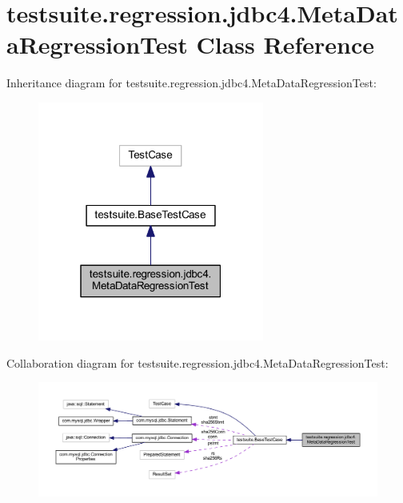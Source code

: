 \hypertarget{classtestsuite_1_1regression_1_1jdbc4_1_1_meta_data_regression_test}{}\section{testsuite.\+regression.\+jdbc4.\+Meta\+Data\+Regression\+Test Class Reference}
\label{classtestsuite_1_1regression_1_1jdbc4_1_1_meta_data_regression_test}


Inheritance diagram for testsuite.\+regression.\+jdbc4.\+Meta\+Data\+Regression\+Test\+:
\nopagebreak
\begin{figure}[H]
\begin{center}
\leavevmode
\includegraphics[width=211pt]{classtestsuite_1_1regression_1_1jdbc4_1_1_meta_data_regression_test__inherit__graph}
\end{center}
\end{figure}


Collaboration diagram for testsuite.\+regression.\+jdbc4.\+Meta\+Data\+Regression\+Test\+:
\nopagebreak
\begin{figure}[H]
\begin{center}
\leavevmode
\includegraphics[width=350pt]{classtestsuite_1_1regression_1_1jdbc4_1_1_meta_data_regression_test__coll__graph}
\end{center}
\end{figure}
